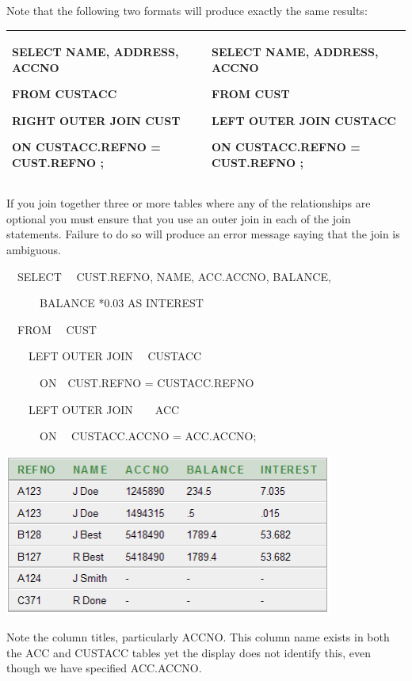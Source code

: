 Note that the following two formats will produce exactly the same results:

\begin{flushleft}
\tablefirsthead{}
\tablehead{}
\tabletail{}
\tablelasttail{}
\begin{supertabular}{|m{7.99cm}|m{7.988cm}|}
\hline
SELECT  NAME, ADDRESS, ACCNO

FROM  CUSTACC

RIGHT OUTER JOIN CUST

ON  CUSTACC.REFNO  = CUST.REFNO ;

 &
SELECT  NAME, ADDRESS, ACCNO

FROM  CUST

LEFT OUTER JOIN  CUSTACC

ON  CUSTACC.REFNO  = CUST.REFNO ;

\\\hline
\end{supertabular}
\end{flushleft}
If you join together three or more tables where any of the relationships are optional you must ensure that you use an outer join in each of the join statements.  Failure to do so will produce an error message saying that the join is ambiguous.

\ \ SELECT \ \ CUST.REFNO, NAME, ACC.ACCNO, BALANCE, 

\ \ \ \ \ \ BALANCE *0.03 AS INTEREST

\ \ FROM \ \ CUST

\ \ \ \ LEFT OUTER JOIN \ \ CUSTACC 

\ \ \ \ \ \ ON\ \ CUST.REFNO  =  CUSTACC.REFNO

\ \ \ \ LEFT OUTER JOIN\ \ \ \ ACC  

\ \ \ \ \ \ ON \ \ CUSTACC.ACCNO  = ACC.ACCNO;

   
\includegraphics[width=10.843cm,height=5.345cm]{images/img (48).png}
 

Note the column titles, particularly ACCNO.  This column name exists in both the ACC and CUSTACC tables yet the display does not identify this, even though we have specified ACC.ACCNO.

